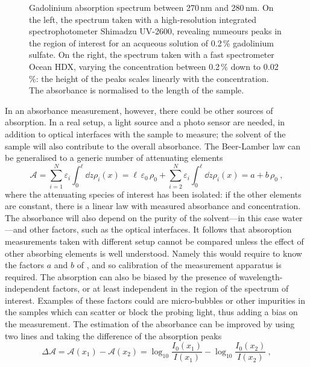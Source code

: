 \begin{figure}
	\centering
	\resizebox{0.45\linewidth}{!}{}
	\resizebox{0.45\linewidth}{!}{}
	\caption{Gadolinium absorption spectrum between 270\,nm and 280\,nm.
		On the left, the spectrum taken with a high-resolution integrated spectrophotometer %
		Shimadzu UV-2600, revealing numeours peaks in the region of interest for an acqueous solution %
		of 0.2\,\% gadolinium sulfate.
		On the right, the spectrum taken with a fast spectrometer Ocean HDX, varying the concentration 
		between 0.2\,\% down to 0.02\,\%: the height of the peaks scales linearly with the concentration.
		The absorbance is normalised to the length of the sample.}
	\label{fig:gad_lines}
\end{figure}


In an absorbance measurement, however, there could be other sources of absorption.
In a real setup, a light source and a photo sensor are needed, in addition to optical interfaces with the %
sample to measure; the solvent of the sample will also contribute to the overall absorbance.
The Beer-Lamber law can be generalised to a generic number of attenuating elements
\begin{equation}
	\label{eq:linear_bl}
	\mathcal{A} = \sum_{i = 1}^N \varepsilon_i \int_0^\ell \dd{z} \rho_i (x) = %
	\ell\,\varepsilon_0\,\rho_0 +  \sum_{i = 2}^N \varepsilon_i \int_0^\ell \dd{z} \rho_i (x) = a + b \, \rho_0\ ,
\end{equation}
where the attenuating species of interest has been isolated: %
if the other elements are constant, there is a linear law with measured absorbance and concentration.
The absorbance will also depend on the purity of the solvent---in this case water---and other factors, %
such as the optical interfaces.
It follows that absoroption measurements taken with different setup cannot be compared unless the %
effect of other absorbing elements is well understood.
Namely this would require to know the factors $a$ and $b$ of , %
and so calibration of the measurement apparatus is required.
The absorption can also be biased by the presence of wavelength-independent factors, %
or at least independent in the region of the spectrum of interest.
Examples of these factors could are micro-bubbles or other impurities in the samples which %
can scatter or block the probing light, thus adding a bias on the measurement.
The estimation of the absorbance can be improved by using two lines and taking the difference of the absorption peaks %
\begin{equation}
	\Delta \mathcal{A} = \mathcal{A}(x_1) - \mathcal{A}(x_2) = %
	\log_{10} \frac{I_0 (x_1)}{I(x_1)} - \log_{10} \frac{I_0 (x_2)}{I(x_2)}\ ,
\end{equation}
